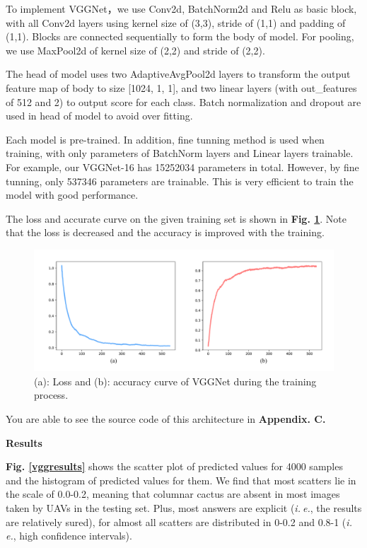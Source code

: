 \documentclass[a4paper]{article}
\begin{document}
\large{

To implement \textsf{VGGNet}，we use Conv2d, BatchNorm2d and Relu as basic block, with all Conv2d layers using kernel size of (3,3), stride of (1,1) and padding of (1,1). Blocks are connected sequentially to form the body of model. For pooling, we use MaxPool2d of kernel size of (2,2) and stride of (2,2). 

The head of model uses two AdaptiveAvgPool2d layers to transform the output feature map of body to size [1024, 1, 1], and two linear layers (with out\_features of 512 and 2) to output score for each class. Batch normalization and dropout are used in head of model to avoid over fitting.

Each model is pre-trained. In addition, fine tunning method is used when training, with only parameters of BatchNorm layers and Linear layers trainable. For example, our \textsf{VGGNet-16} has 15252034 parameters in total. However, by fine tunning, only 537346 parameters are trainable. This is very efficient to train the model with good performance.

The loss and accurate curve on the given training set is shown in \textbf{Fig. \ref{vggacc}}. Note that the loss is decreased and the accuracy is improved with the training.

\begin{figure}[h]
\centering
\includegraphics[width=15cm]{vgg_acc.pdf}
\caption{(a): Loss and (b): accuracy curve of \textsf{VGGNet} during the training process.}
\label{vggacc}
\end{figure}

}

\large{You are able to see the source code of this architecture in \textbf{Appendix. C.}}
\vspace{2mm}
\begin{center}
\large\textbf{Results} \\
\end{center}

\large{

\textbf{Fig. \ref{vggresults}} shows the scatter plot of predicted values for 4000 samples and the histogram of predicted values for them. We find that most scatters lie in the scale of 0.0-0.2, meaning that columnar cactus are absent in most images taken by UAVs in the testing set. Plus, most answers are explicit (\textit{i.$\ $e.}, the results are relatively sured), for almost all scatters are distributed in 0-0.2 and 0.8-1 (\textit{i.$\ $e.}, high confidence intervals).

}
\end{document}

